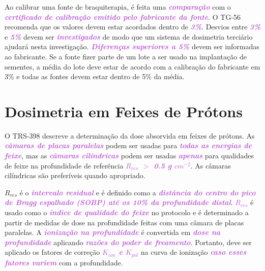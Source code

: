 \documentclass[11pt,a4paper]{article}
\begin{document}
	Ao calibrar uma fonte de braquiterapia, é feita uma \textcolor{MediumOrchid}{\textbf{\textit{comparação}}} com o \textcolor{MediumOrchid}{\textbf{\textit{certificado de calibração emitido pelo fabricante da fonte}}}. O TG-56 recomenda que os valores devem estar acordados dentro de \textcolor{MediumOrchid}{\textbf{\textit{3\%}}}. Desvios entre \textcolor{MediumOrchid}{\textbf{\textit{3\%}}} e \textcolor{MediumOrchid}{\textbf{\textit{5\%}}} devem ser \textcolor{MediumOrchid}{\textbf{\textit{investigados}}} de modo que um sistema de dosimetria terciário ajudará nesta investigação. \textcolor{MediumOrchid}{\textbf{\textit{Diferenças superiores a 5\%}}} devem ser informadas ao fabricante. Se a fonte fizer parte de um lote a ser usado na implantação de sementes, a média do lote deve estar de acordo com a calibração do fabricante em 3\% e todas as fontes devem estar dentro de 5\% da média.

\section{Dosimetria em Feixes de Prótons}

	O TRS-398 descreve a determinação da dose absorvida em feixes de prótons. As \textcolor{MediumOrchid}{\textbf{\textit{câmaras de placas paralelas}}} podem ser usadas para \textcolor{MediumOrchid}{\textbf{\textit{todas as energias de feixe}}}, mas as \textcolor{MediumOrchid}{\textbf{\textit{câmaras cilíndricas}}} podem ser usadas \textcolor{MediumOrchid}{\textbf{\textit{apenas}}} para qualidades de feixe na profundidade de referência \textcolor{MediumOrchid}{\textbf{\textit{$R_{res}$ $>$ 0.5 g $cm^{-2}$}}}. As câmaras cilíndricas são preferíveis quando apropriado. 
	
	$R_{res}$ é o \textcolor{MediumOrchid}{\textbf{\textit{intervalo residual}}} e é definido como a \textcolor{MediumOrchid}{\textbf{\textit{distância do centro do pico de Bragg espalhado (SOBP) até os 10\% da profundidade distal}}}. \textcolor{MediumOrchid}{\textbf{\textit{$R_{res}$}}} é usado como o \textcolor{MediumOrchid}{\textbf{\textit{índice de qualidade do feixe}}} no protocolo e é determinado a partir de medidas de dose na profundidade feitas com uma câmara de placas paralelas. A \textcolor{MediumOrchid}{\textbf{\textit{ionização na profundidade}}} é convertida em \textcolor{MediumOrchid}{\textbf{\textit{dose na profundidade}}} aplicando \textcolor{MediumOrchid}{\textbf{\textit{razões do poder de freamento}}}. Portanto, deve ser aplicado os fatores de correção \textcolor{MediumOrchid}{\textbf{\textit{$K_{ion}$ e $K_{pol}$}}} na curva de ionização\textcolor{MediumOrchid}{\textbf{\textit{ caso esses fatores variem}}} com a profundidade.
\end{document}
